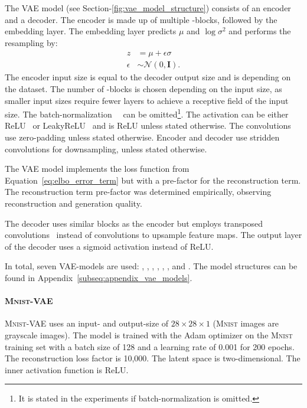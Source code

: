 The \ac{VAE} model (see Section-\ref{fig:vae_model_structure}) consists of an encoder and a decoder.
The encoder is made up of multiple -blocks, followed by the embedding layer.
The embedding layer predicts $\mu$ and $\log \sigma^2$ and performs the resampling by:
\begin{align}
    z &= \mu + \epsilon\sigma \\
    \epsilon &\sim \mathcal{N}(0, \bm{I}). \label{eq:resampling_vae}
\end{align}
The encoder input size is equal to the decoder output size and is depending on the dataset.
The number of -blocks is chosen depending on the input size, as smaller input sizes require fewer layers to achieve a receptive field of the input size.
The batch-normalization~~\citep[pp. 317, ff.]{Goodfellow-et-al-2016} can be omitted\footnote{It is stated in the experiments if batch-normalization is omitted.}.
The activation can be either ReLU~\citep[p. 173]{Goodfellow-et-al-2016} or LeakyReLU~\citep[p. 192]{Goodfellow-et-al-2016} and is ReLU unless stated otherwise.
The convolutions use zero-padding unless stated otherwise.
Encoder and decoder use stridden convolutions for downsampling, unless stated otherwise.

The \ac{VAE} model implements the loss function from Equation~\ref{eq:elbo_error_term} but with a pre-factor for the reconstruction term.
The reconstruction term pre-factor was determined empirically, observing reconstruction and generation quality.

The decoder uses similar blocks as the encoder but employs transposed convolutions~\citep[pp. 356, ff.]{Goodfellow-et-al-2016} instead of convolutions to upsample feature maps.
The output layer of the decoder uses a sigmoid activation instead of ReLU.

In total, seven \ac{VAE}-models are used: , , , , ,  , and .
The model structures can be found in Appendix~\ref{subseq:appendix_vae_models}.

\paragraph{\textsc{Mnist}-\ac{VAE}} \textsc{Mnist}-\ac{VAE} uses an input- and output-size of $28\times 28\times 1$ (\textsc{Mnist} images are grayscale images).
The model is trained with the Adam optimizer on the \textsc{Mnist} training set with a batch size of 128 and a learning rate of 0.001 for 200 epochs.
The reconstruction loss factor is 10,000.
The latent space is two-dimensional.
The inner activation function is ReLU.


